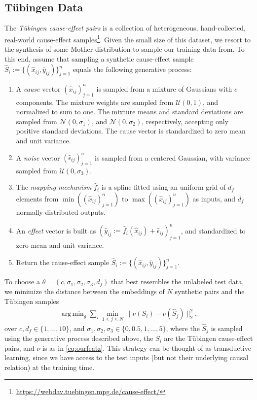 \documentclass[twoside,11pt,a4paper]{article}
\DeclareMathOperator*{\argmin}{arg\,min}
\newcommand{\U}{\mathcal{U}}
\newcommand{\N}{\mathcal{N}}
\begin{document}
\subsection{T\"ubingen Data}
The \emph{T\"ubingen cause-effect pairs} is a collection of heterogeneous,
hand-collected, real-world cause-effect
samples\footnote{\url{https://webdav.tuebingen.mpg.de/cause-effect/}}. Given
the small size of this dataset, we resort to the synthesis of some Mother
distribution to sample our training data from.  To this end, assume that
sampling a synthetic cause-effect sample $\hat{S}_i := \{(\hat{x}_{ij},
\hat{y}_{ij})\}_{j=1}^n$ equals the following 
generative process:
\begin{enumerate}
  \item A \emph{cause} vector $(\hat{x}_{ij})_{j=1}^{n}$ is sampled from a
  mixture of Gaussians with $c$ components. The mixture weights are
  sampled from $\U(0,1)$, and normalized to sum to one. The mixture means and
  standard deviations are sampled from $\N(0,\sigma_1)$, and $\N(0,\sigma_2)$,
  respectively, accepting only positive standard deviations.
  The cause vector is standardized to zero mean and unit variance.
  \item A \emph{noise} vector $(\hat{\epsilon}_{ij})_{j=1}^{n}$ is sampled from a
  centered Gaussian, with variance sampled from $\U(0,\sigma_3)$.
  \item The \emph{mapping mechanism} $\hat{f}_i$ is a spline fitted
  using an uniform grid of $d_f$ elements from
  $\min((\hat{x}_{ij})_{j=1}^n)$ to $\max((\hat{x}_{ij})_{j=1}^n)$ as inputs, and 
  $d_f$ normally distributed outputs.
  \item An \emph{effect} vector is built as $(\hat{y}_{ij} :=
  \hat{f}_i(\hat{x}_{ij})+\hat{\epsilon}_{ij})_{j=1}^n$, and
  standardized to zero mean and unit variance.
  \item Return the cause-effect sample $\hat{S}_i := \{(\hat{x}_{ij},
  \hat{y}_{ij})\}_{j=1}^n$.
\end{enumerate}
To choose a $\theta = (c,\sigma_1, \sigma_2, \sigma_3, d_f)$
that best resembles the unlabeled test data, we minimize the distance between the
embeddings of $N$ synthetic pairs and the T\"{u}bingen samples 
\begin{align*}
  \argmin_\theta \sum_{i}^{} \min_{1 \leq j \leq N} \| \nu(S_i)-\nu(\hat{S}_j) \|^2_2,
\end{align*}
over $c,d_f \in \{1, \ldots, 10\}$, and $\sigma_1, \sigma_2, \sigma_3 \in
\{0, 0.5, 1, \ldots, 5\}$, where the $\hat{S}_j$ is sampled using the
generative process described above, the $S_i$ are the T\"ubingen cause-effect
pairs, and $\nu$ is as in \eqref{eq:ourfeatz}.  This strategy can be thought of
as transductive learning, since we have access to the test inputs (but not
their underlying causal relation) at the training time.  
\end{document}
